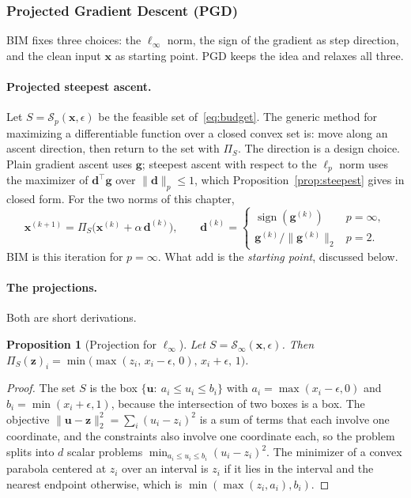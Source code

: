 \documentclass[10pt,a4paper]{extarticle}
\newtheorem{proposition}[theorem]{Proposition}
\theoremstyle{definition}
\newcommand{\x}{\mathbf{x}}
\newcommand{\Proj}{\Pi}
\DeclareMathOperator{\sign}{sign}
\begin{document}
\subsubsection{Projected Gradient Descent (PGD)}

BIM fixes three choices: the \(\ell_\infty\) norm, the sign of the gradient as step direction, and the clean input \(\x\) as starting point. PGD keeps the idea and relaxes all three.

\paragraph{Projected steepest ascent.} Let \(S=\mathcal{S}_p(\x,\epsilon)\) be the feasible set of~\eqref{eq:budget}. The generic method for maximizing a differentiable function over a closed convex set is: move along an ascent direction, then return to the set with \(\Proj_S\). The direction is a design choice. Plain gradient ascent uses \(\mathbf{g}\); steepest ascent with respect to the \(\ell_p\) norm uses the maximizer of \(\mathbf{d}^\top\mathbf{g}\) over \(\|\mathbf{d}\|_p\le1\), which Proposition~\ref{prop:steepest} gives in closed form. For the two norms of this chapter,
\[
\x^{(k+1)}=\Proj_S\big(\x^{(k)}+\alpha\,\mathbf{d}^{(k)}\big),\qquad
\mathbf{d}^{(k)}=\begin{cases}\sign(\mathbf{g}^{(k)}) & p=\infty,\\ \mathbf{g}^{(k)}/\|\mathbf{g}^{(k)}\|_2 & p=2.\end{cases}
\]
BIM is this iteration for \(p=\infty\). What \citet{madry2018towards} add is the \emph{starting point}, discussed below.

\paragraph{The projections.} Both are short derivations.

\begin{proposition}[Projection for \(\ell_\infty\)]\label{prop:projinf}
Let \(S=\mathcal{S}_\infty(\x,\epsilon)\). Then \(\Proj_S(\mathbf{z})_i=\min\big(\max(z_i,\,x_i-\epsilon,\,0),\,x_i+\epsilon,\,1\big)\).
\end{proposition}

\begin{proof}
The set \(S\) is the box \(\{\mathbf{u}:\ a_i\le u_i\le b_i\}\) with \(a_i=\max(x_i-\epsilon,0)\) and \(b_i=\min(x_i+\epsilon,1)\), because the intersection of two boxes is a box. The objective \(\|\mathbf{u}-\mathbf{z}\|_2^2=\sum_i(u_i-z_i)^2\) is a sum of terms that each involve one coordinate, and the constraints also involve one coordinate each, so the problem splits into \(d\) scalar problems \(\min_{a_i\le u_i\le b_i}(u_i-z_i)^2\). The minimizer of a convex parabola centered at \(z_i\) over an interval is \(z_i\) if it lies in the interval and the nearest endpoint otherwise, which is \(\min(\max(z_i,a_i),b_i)\).
\end{proof}
\end{document}
